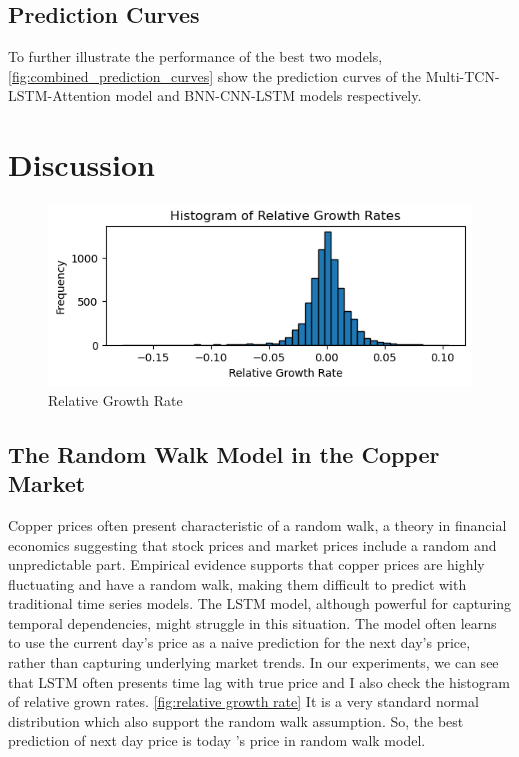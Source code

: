\documentclass[final-report]{report-template}
\begin{document}
\subsection{Prediction Curves}
To further illustrate the performance of the best two models, \autoref{fig:combined_prediction_curves} show the prediction curves of the Multi-TCN-LSTM-Attention model and BNN-CNN-LSTM models respectively.

\section{Discussion}

\begin{figure}[h]
    \centering
    \includegraphics[width=0.8\linewidth]{figures/relative_incrrease.png}
    \caption{Relative Growth Rate}
    \label{fig:relative growth rate}
\end{figure}
\subsection{The Random Walk Model in the Copper Market}
Copper prices often present characteristic of a random walk, a theory in financial economics suggesting that stock prices and market prices include a random and unpredictable part. Empirical evidence supports that copper prices are highly fluctuating and have a random walk, making them difficult to predict with traditional time series models. The LSTM model, although powerful for capturing temporal dependencies, might struggle in this situation. The model often learns to use the current day's price as a naive prediction for the next day's price, rather than capturing underlying market trends. In our experiments, we can see that LSTM often presents time lag with true price and I also check the histogram of relative grown rates. \autoref{fig:relative growth rate} It is a very standard normal distribution which also support the random walk assumption. So, the best prediction of next day price is today 's price in random walk model.
\end{document}
